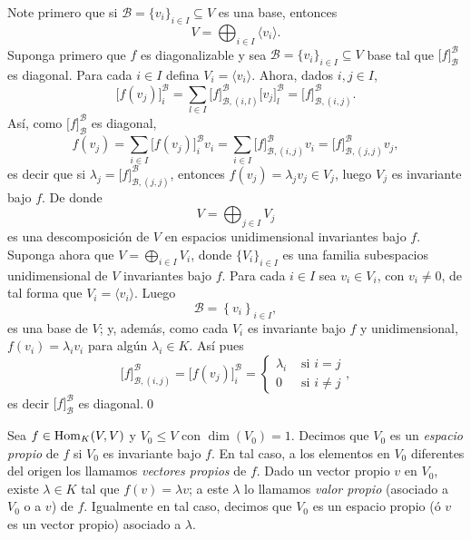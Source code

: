 \dem Note primero que si $\mathcal{B}=\{v_i\}_{i\in I}\subseteq V$ es una base, entonces
\[
V=\bigoplus_{i\in I}\langle v_i\rangle.
\]
Suponga primero que $f$ es diagonalizable y sea $\mathcal{B}=\{v_i\}_{i\in I}\subseteq V$ base tal que $\Big[f\Big]^{\mathcal{B}}_{\mathcal{B}}$ es diagonal. Para cada $i\in I$ defina $V_i=\langle v_i\rangle$. Ahora, dados $i,j\in I$,
\[
\Big[f(v_j)\Big]^{\mathcal{B}}_i=\sum_{l\in I}\Big[f\Big]^{\mathcal{B}}_{\mathcal{B},(i,l)}\Big[v_j\Big]^{\mathcal{B}}_l=\Big[f\Big]^{\mathcal{B}}_{\mathcal{B},(i,j)}.
\]
As\'i, como $\Big[f\Big]^{\mathcal{B}}_{\mathcal{B}}$ es diagonal,
\[
f(v_j)=\sum_{i\in I}\Big[f(v_j)\Big]^{\mathcal{B}}_{i}v_i=\sum_{i\in I}\Big[f\Big]^{\mathcal{B}}_{\mathcal{B},(i,j)}v_i=\Big[f\Big]^{\mathcal{B}}_{\mathcal{B},(j,j)}v_j,
\]
es decir que si $\lambda_j=\Big[f\Big]^{\mathcal{B}}_{\mathcal{B},(j,j)}$, entonces $f(v_j)=\lambda_j v_j\in V_j$, luego $V_j$ es invariante bajo $f$. De donde
\[
V=\bigoplus_{j\in I}V_j
\]
es una descomposici\'on de $V$ en espacios unidimensional invariantes bajo $f$.\\
Suponga ahora que $V=\bigoplus_{i\in I}V_i$, donde $\{V_i\}_{i\in I}$ es una familia subespacios unidimensional de $V$ invariantes bajo $f$. Para cada $i\in I$ sea $v_i\in V_i$, con $v_i\ne 0$, de tal forma que $V_i=\langle v_i\rangle$. Luego
\[
\mathcal{B}=\left\{v_i\right\}_{i\in I},
\]
es una base de $V$; y, adem\'as, como cada $V_i$ es invariante bajo $f$ y unidimensional, $f(v_i)=\lambda_iv_i$ para alg\'un $\lambda_i\in K$. As\'i pues
\[
\Big[f\Big]^{\mathcal{B}}_{\mathcal{B},(i,j)}=\Big[f(v_j)\Big]^{\mathcal{B}}_i=
\left\{\begin{array}{rl} \lambda_i &\textrm{ si } i=j\\ 0 &\textrm{ si } i\ne j \end{array}\right.,
\]
es decir $\Big[f\Big]^{\mathcal{B}}_{\mathcal{B}}$ es diagonal.\qed

\begin{defn}
Sea $f\in\operatorname{Hom}_K(V,V)$ y $V_0\le V$ con $\dim(V_0)=1$. Decimos que $V_0$ es un \emph{espacio propio} de $f$ si $V_0$ es invariante bajo $f$. En tal caso, a los elementos en $V_0$ diferentes del origen los llamamos \emph{vectores propios} de $f$. Dado un vector propio $v$ en $V_0$, existe $\lambda\in K$ tal que $f(v)=\lambda v$; a este $\lambda$ lo llamamos \emph{valor propio} (asociado a $V_0$ o a $v$) de $f$. Igualmente en tal caso, decimos que $V_0$ es un espacio propio (\'o $v$ es un vector propio) asociado a $\lambda$.
\end{defn}

